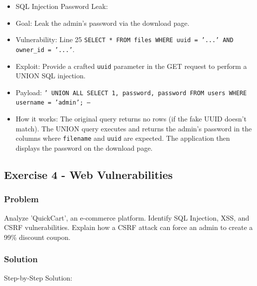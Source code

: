 \documentclass{article}
\begin{document}
\begin{itemize}
    \item[\textbf{3.}] SQL Injection Password Leak:
    \item Goal: Leak the admin's password via the download page.
    \item Vulnerability: Line 25 \texttt{SELECT * FROM files WHERE uuid = '...' AND owner\_id = '...'}.
    \item Exploit: Provide a crafted \texttt{uuid} parameter in the GET request to perform a UNION SQL injection.
    \item Payload: \texttt{' UNION ALL SELECT 1, password, password FROM users WHERE username = 'admin'; -- }
    \item How it works: The original query returns no rows (if the fake UUID doesn't match). The UNION query executes and returns the admin's password in the columns where \texttt{filename} and \texttt{uuid} are expected. The application then displays the password on the download page.
\end{itemize}

\subsection{Exercise 4 - Web Vulnerabilities}
\subsubsection*{Problem}
Analyze 'QuickCart', an e-commerce platform. Identify SQL Injection, XSS, and CSRF vulnerabilities. Explain how a CSRF attack can force an admin to create a 99\% discount coupon.

\subsubsection*{Solution}
Step-by-Step Solution:
\end{document}
